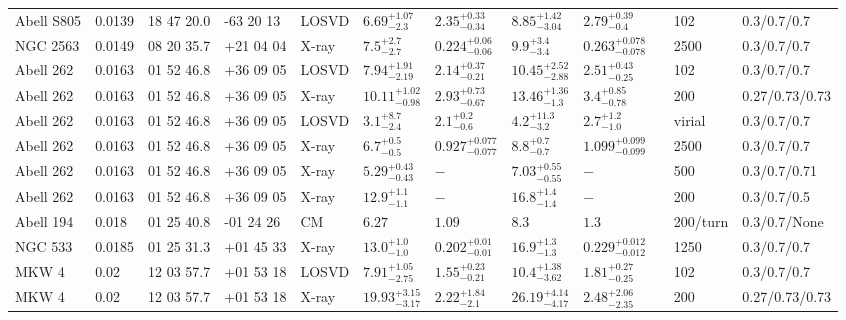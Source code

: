 \begin{landscape}
\begin{center}
{\begin{longtable}{llllllllllll}
Abell S805 & 0.0139 & 18 47 20.0 & -63 20 13 & LOSVD & ${6.69}^{+1.07}_{-2.3}$ & ${2.35}^{+0.33}_{-0.34}$ & ${8.85}^{+1.42}_{-3.04}$ & ${2.79}^{+0.39}_{-0.4}$ & \citet{WO10.1} & 102 & 0.3/0.7/0.7 \\
NGC 2563 & 0.0149 & 08 20 35.7 & +21 04 04 & X-ray & ${7.5}^{+2.7}_{-2.7}$ & ${0.224}^{+0.06}_{-0.06}$ & ${9.9}^{+3.4}_{-3.4}$ & ${0.263}^{+0.078}_{-0.078}$ & \citet{GA06.1} & 2500 & 0.3/0.7/0.7 \\
Abell 262 & 0.0163 & 01 52 46.8 & +36 09 05 & LOSVD & ${7.94}^{+1.91}_{-2.19}$ & ${2.14}^{+0.37}_{-0.21}$ & ${10.45}^{+2.52}_{-2.88}$ & ${2.51}^{+0.43}_{-0.25}$ & \citet{WO10.1} & 102 & 0.3/0.7/0.7 \\
Abell 262 & 0.0163 & 01 52 46.8 & +36 09 05 & X-ray & ${10.11}^{+1.02}_{-0.98}$ & ${2.93}^{+0.73}_{-0.67}$ & ${13.46}^{+1.36}_{-1.3}$ & ${3.4}^{+0.85}_{-0.78}$ & \citet{BA14.1} & 200 & 0.27/0.73/0.73 \\
Abell 262 & 0.0163 & 01 52 46.8 & +36 09 05 & LOSVD & ${3.1}^{+8.7}_{-2.4}$ & ${2.1}^{+0.2}_{-0.6}$ & ${4.2}^{+11.3}_{-3.2}$ & ${2.7}^{+1.2}_{-1.0}$ & \citet{LO06.1} & virial & 0.3/0.7/0.7 \\
Abell 262 & 0.0163 & 01 52 46.8 & +36 09 05 & X-ray & ${6.7}^{+0.5}_{-0.5}$ & ${0.927}^{+0.077}_{-0.077}$ & ${8.8}^{+0.7}_{-0.7}$ & ${1.099}^{+0.099}_{-0.099}$ & \citet{GA06.1} & 2500 & 0.3/0.7/0.7 \\
Abell 262 & 0.0163 & 01 52 46.8 & +36 09 05 & X-ray & ${5.29}^{+0.43}_{-0.43}$ & ${-}^{}_{}$ & ${7.03}^{+0.55}_{-0.55}$ & ${-}^{}_{}$ & \citet{VI06.1} & 500 & 0.3/0.7/0.71 \\
Abell 262 & 0.0163 & 01 52 46.8 & +36 09 05 & X-ray & ${12.9}^{+1.1}_{-1.1}$ & ${-}^{}_{}$ & ${16.8}^{+1.4}_{-1.4}$ & ${-}^{}_{}$ & \citet{XU01.1} & 200 & 0.3/0.7/0.5 \\
Abell 194 & 0.018 & 01 25 40.8 & -01 24 26 & CM & ${6.27}^{}_{}$ & ${1.09}^{}_{}$ & ${8.3}^{}_{}$ & ${1.3}^{}_{}$ & \citet{RI03.1} & 200/turn & 0.3/0.7/None \\
NGC 533 & 0.0185 & 01 25 31.3 & +01 45 33 & X-ray & ${13.0}^{+1.0}_{-1.0}$ & ${0.202}^{+0.01}_{-0.01}$ & ${16.9}^{+1.3}_{-1.3}$ & ${0.229}^{+0.012}_{-0.012}$ & \citet{GA06.1} & 1250 & 0.3/0.7/0.7 \\
MKW 4 & 0.02 & 12 03 57.7 & +01 53 18 & LOSVD & ${7.91}^{+1.05}_{-2.75}$ & ${1.55}^{+0.23}_{-0.21}$ & ${10.4}^{+1.38}_{-3.62}$ & ${1.81}^{+0.27}_{-0.25}$ & \citet{WO10.1} & 102 & 0.3/0.7/0.7 \\
MKW 4 & 0.02 & 12 03 57.7 & +01 53 18 & X-ray & ${19.93}^{+3.15}_{-3.17}$ & ${2.22}^{+1.84}_{-2.1}$ & ${26.19}^{+4.14}_{-4.17}$ & ${2.48}^{+2.06}_{-2.35}$ & \citet{BA14.1} & 200 & 0.27/0.73/0.73 \\

\end{longtable}}
\end{center}
\end{landscape}
